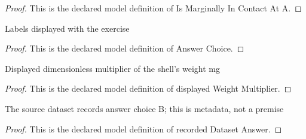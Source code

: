 \begin{proof}
  This is the declared model definition of Is Marginally In Contact At A.
\end{proof}
\begin{definition}
  \label{def:physics:phyx-mini-0786:phyxminiproblems-problemphyxmini0786-answerchoice}
  Labels displayed with the exercise
\end{definition}
\begin{proof}
  This is the declared model definition of Answer Choice.
\end{proof}
\begin{definition}
  \label{def:physics:phyx-mini-0786:phyxminiproblems-problemphyxmini0786-displayedweightmultiplier}
  Displayed dimensionless multiplier of the shell's weight mg
\end{definition}
\begin{proof}
  This is the declared model definition of displayed Weight Multiplier.
\end{proof}
\begin{definition}
  \label{def:physics:phyx-mini-0786:phyxminiproblems-problemphyxmini0786-recordeddatasetanswer}
  The source dataset records answer choice B; this is metadata, not a premise
\end{definition}
\begin{proof}
  This is the declared model definition of recorded Dataset Answer.
\end{proof}
